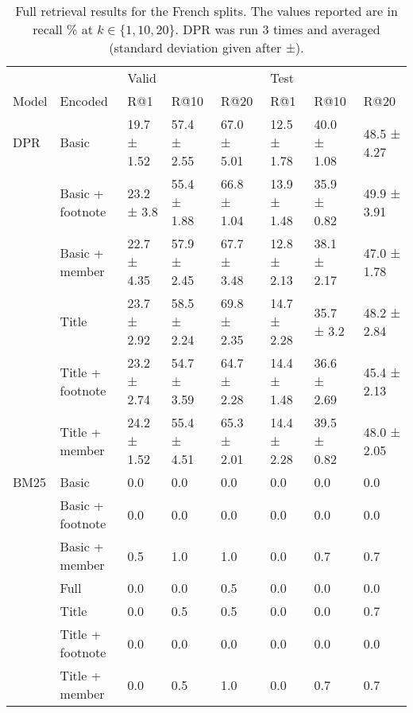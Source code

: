 \documentclass[11pt]{article}
\begin{document}
\begin{table*}[h]
    \small
    \centering
\begin{tabular}{llllllll}
\toprule
     &                & \multicolumn{3}{l}{Valid} & \multicolumn{3}{l}{Test} \\
Model & Encoded &          R@1 &         R@10 &         R@20 &          R@1 &         R@10 &         R@20 \\
\midrule
DPR & Basic &  19.7 ± 1.52 &  57.4 ± 2.55 &  67.0 ± 5.01 &  12.5 ± 1.78 &  40.0 ± 1.08 &  48.5 ± 4.27 \\
     & Basic + footnote &   23.2 ± 3.8 &  55.4 ± 1.88 &  66.8 ± 1.04 &  13.9 ± 1.48 &  35.9 ± 0.82 &  49.9 ± 3.91 \\
     & Basic + member &  22.7 ± 4.35 &  57.9 ± 2.45 &  67.7 ± 3.48 &  12.8 ± 2.13 &  38.1 ± 2.17 &  47.0 ± 1.78 \\
     & Title &  23.7 ± 2.92 &  58.5 ± 2.24 &  69.8 ± 2.35 &  14.7 ± 2.28 &   35.7 ± 3.2 &  48.2 ± 2.84 \\
     & Title + footnote &  23.2 ± 2.74 &  54.7 ± 3.59 &  64.7 ± 2.28 &  14.4 ± 1.48 &  36.6 ± 2.69 &  45.4 ± 2.13 \\
     & Title + member &  24.2 ± 1.52 &  55.4 ± 4.51 &  65.3 ± 2.01 &  14.4 ± 2.28 &  39.5 ± 0.82 &  48.0 ± 2.05 \\
\midrule
BM25 & Basic &          0.0 &          0.0 &          0.0 &          0.0 &          0.0 &          0.0 \\
     & Basic + footnote &          0.0 &          0.0 &          0.0 &          0.0 &          0.0 &          0.0 \\
     & Basic + member &          0.5 &          1.0 &          1.0 &          0.0 &          0.7 &          0.7 \\
     & Full &          0.0 &          0.0 &          0.5 &          0.0 &          0.0 &          0.0 \\
     & Title &          0.0 &          0.5 &          0.5 &          0.0 &          0.0 &          0.7 \\
     & Title + footnote &          0.0 &          0.0 &          0.0 &          0.0 &          0.0 &          0.0 \\
     & Title + member &          0.0 &          0.5 &          1.0 &          0.0 &          0.7 &          0.7 \\
\bottomrule
\end{tabular}
    \caption{Full retrieval results for the French splits. The values reported are in recall \% at $k \in \{1,10,20\}$. DPR was run 3 times and averaged (standard deviation given after ±).}
    \label{tab:full_retrieval_results_french}
\end{table*}
\end{document}
